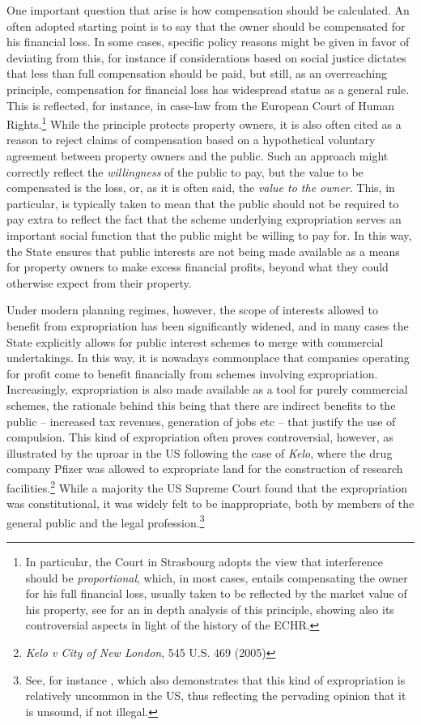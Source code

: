 One important question that arise is how compensation should be calculated. An often adopted starting point is to say that the owner should be compensated for his financial loss. In some cases, specific policy reasons might be given in favor of deviating from this, for instance if considerations based on social justice dictates that less than full compensation should be paid, but still, as an overreaching principle, compensation for financial loss has widespread status as a general rule. This is reflected, for instance, in case-law from the European Court of Human Rights.\footnote{In particular, the Court in Strasbourg adopts the view that interference should be \emph{proportional}, which, in most cases, entails compensating the owner for his full financial loss, usually taken to be reflected by the market value of his property, see \cite{AllenCom} for an in depth analysis of this principle, showing also its controversial aspects in light of the history of the ECHR.} While the principle protects property owners, it is also often cited as a reason to reject claims of compensation based on a hypothetical voluntary agreement between property owners and the public. Such an approach might correctly reflect the \emph{willingness} of the public to pay, but the value to be compensated is the loss, or, as it is often said, the \emph{value to the owner}. This, in particular, is typically taken to mean that the public should not be required to pay extra to reflect the fact that the scheme underlying expropriation serves an important social function that the public might be willing to pay for. In this way, the State ensures that public interests are not being made available as a means for property owners to make excess financial profits, beyond what they could otherwise expect from their property.

Under modern planning regimes, however, the scope of interests allowed to benefit from expropriation has been significantly widened, and in many cases the State explicitly allows for public interest schemes to merge with commercial undertakings. In this way, it is nowadays commonplace that companies operating for profit come to benefit financially from schemes involving expropriation. Increasingly, expropriation is also made available as a tool for purely commercial schemes, the rationale behind this being that there are indirect benefits to the public -- increased tax revenues, generation of jobs etc -- that justify the use of compulsion. This kind of expropriation often proves controversial, however, as illustrated by the uproar in the US following the case of \emph{Kelo}, where the drug company Pfizer was allowed to expropriate land for the construction of research facilities.\footnote{\emph{Kelo v City of New London}, 545 U.S. 469 (2005)} While a majority the US Supreme Court found that the expropriation was constitutional, it was widely felt to be inappropriate, both by members of the general public and the legal profession.\footnote{See, for instance \cite{notimminent}, which also demonstrates that this kind of expropriation is relatively uncommon in the US, thus reflecting the pervading opinion that it is unsound, if not illegal.}

